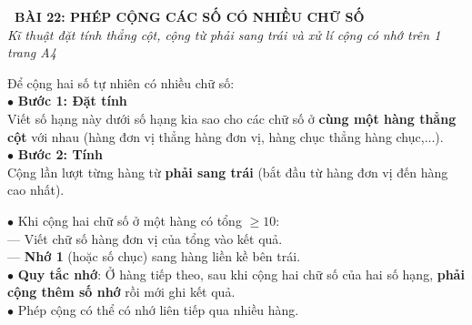 \documentclass[14pt,a4paper,oneside]{extbook}
\begin{document}
\noindent
\begin{tcolorbox}[
  enhanced,
  colback=teal!8!white,
  colframe=teal!80!black,
  arc=3mm, boxrule=1pt,
  left=3mm, right=3mm, top=2mm, bottom=2mm,
  halign=center
]
  {\Large\bfseries\color{teal!90!black}\faBookmark\ BÀI 22: PHÉP CỘNG CÁC SỐ CÓ NHIỀU CHỮ SỐ}\\[1.5pt]
  {\footnotesize\itshape\color{black!75} Kĩ thuật đặt tính thẳng cột, cộng từ phải sang trái và xử lí cộng có nhớ trên 1 trang A4}
\end{tcolorbox}

\vspace{2mm}

\noindent
\begin{minipage}[t]{0.49\textwidth}
  \begin{tcolorbox}[
    enhanced,
    title={\footnotesize\bfseries\color{white}\faPlusSquare\ 1. Quy tắc Đặt tính rồi tính},
    colback=blue!2!white,
    colframe=blue!75!black,
    arc=2.5mm, boxrule=0.8pt, top=1.8mm, bottom=1.8mm, left=2mm, right=2mm
  ]
    \footnotesize
    Để cộng hai số tự nhiên có nhiều chữ số:\\
    $\bullet$ \textbf{Bước 1: Đặt tính}\\
    Viết số hạng này dưới số hạng kia sao cho các chữ số ở \textbf{cùng một hàng thẳng cột} với nhau (hàng đơn vị thẳng hàng đơn vị, hàng chục thẳng hàng chục,...).\\
    $\bullet$ \textbf{Bước 2: Tính}\\
    Cộng lần lượt từng hàng từ \textbf{phải sang trái} (bắt đầu từ hàng đơn vị đến hàng cao nhất).
  \end{tcolorbox}
\end{minipage}%
\hfill
\begin{minipage}[t]{0.49\textwidth}
  \begin{tcolorbox}[
    enhanced,
    title={\footnotesize\bfseries\color{white}\faExclamationCircle\ 2. Kĩ thuật cộng có nhớ},
    colback=teal!2!white,
    colframe=teal!75!black,
    arc=2.5mm, boxrule=0.8pt, top=1.8mm, bottom=1.8mm, left=2mm, right=2mm
  ]
    \footnotesize
    $\bullet$ Khi cộng hai chữ số ở một hàng có tổng $\ge 10$:\\
    --- Viết chữ số hàng đơn vị của tổng vào kết quả.\\
    --- \textbf{Nhớ 1} (hoặc số chục) sang hàng liền kề bên trái.\\
    $\bullet$ \textbf{Quy tắc nhớ}: Ở hàng tiếp theo, sau khi cộng hai chữ số của hai số hạng, \textbf{phải cộng thêm số nhớ} rồi mới ghi kết quả.\\
    $\bullet$ Phép cộng có thể có nhớ liên tiếp qua nhiều hàng.
  \end{tcolorbox}
\end{minipage}
\end{document}

